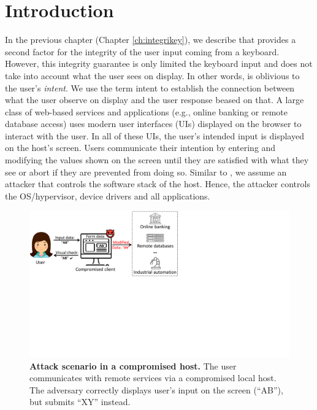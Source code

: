 \section{Introduction}
\label{integriscreen:sec:intro}

In the previous chapter (Chapter \ref{ch:integrikey}), we describe \integrikey that provides a second factor for the integrity of the user input coming from a keyboard. However, this integrity guarantee is only limited the keyboard input and does not take into account what the user sees on display. In other words, \integrikey is oblivious to the user's \emph{intent}. We use the term intent to establish the connection between what the user observe on display and the user response beased on that. A large class of web-based services and applications (e.g., online banking or remote database access) uses modern user interfaces (UIs) displayed on the browser to interact with the user. In all of these UIs, the user's intended input is displayed on the host's screen. Users communicate their intention by entering and modifying the values shown on the screen until they are satisfied with what they see or abort if they are prevented from doing so. Similar to \integrikey, we assume an attacker that controls the software stack of the host. Hence, the attacker controls the OS/hypervisor, device drivers and all applications. 


\begin{figure}[t]
 \centering
\includegraphics[trim={0 10.4cm 14.4cm 0},clip,width=0.75\linewidth]{chapters/IntegriScreen/img/motivatingScenario.pdf}
\caption[Attack scenario in a compromised host]{\textbf{Attack scenario in a compromised host.}
 	The user communicates with remote services via a compromised local host. The adversary correctly displays user's input on the screen (``AB''), but submits ``XY'' instead.
 	}
 \label{fig:scenario}
\end{figure}



